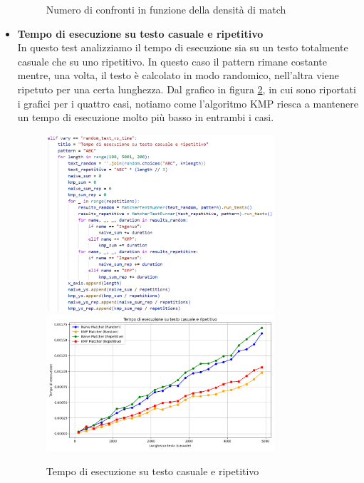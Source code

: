 \documentclass{article}
\begin{document}
\begin{itemize}
\begin{figure}[H]
            \caption{Numero di confronti in funzione della densità di match}
            \label{fig:test-6}
        \end{figure}
    \newpage
    \item \textbf{Tempo di esecuzione su testo casuale e ripetitivo}\\
        In questo test analizziamo il tempo di esecuzione sia su un testo totalmente casuale che su uno ripetitivo. In questo caso il pattern rimane costante mentre, una volta, il testo è calcolato in modo randomico, nell'altra viene ripetuto per una certa lunghezza. Dal grafico in figura \ref{fig:test-7}, in cui sono riportati i grafici per i quattro casi, notiamo come l'algoritmo KMP riesca a mantenere un tempo di esecuzione molto più basso in entrambi i casi.
        \begin{figure}[H]
            \centering
            \includegraphics[width=0.8\textwidth]{img/Test7.png}
            \includegraphics[width=0.8\textwidth]{img/Graph7.png}
            \caption{Tempo di esecuzione su testo casuale e ripetitivo}
            \label{fig:test-7}
        \end{figure}
    \newpage

\end{itemize}
\end{document}
